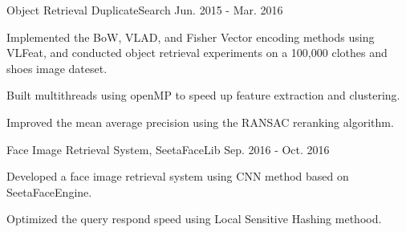 \begin{cventries}
  \cventry
    {Object Retrieval} %
    {DuplicateSearch} %
    {} %
    {Jun. 2015 - Mar. 2016} %
    {
      \begin{cvitems} %
        \item {Implemented the BoW, VLAD, and Fisher Vector encoding methods using VLFeat, and conducted object retrieval experiments on a 100,000 clothes and shoes image dateset.}
        \item {Built multithreads using openMP to speed up feature extraction and clustering.}
        \item {Improved the mean average precision using the RANSAC reranking algorithm.}
      \end{cvitems}
    }

  \cventry
    {Face Image Retrieval System, \href{https://github.com/willard-yuan/SeetaFaceLib}{\color{blue}{Code}}} %
    {SeetaFaceLib} %
    {} %
    {Sep. 2016 - Oct. 2016} %
    {
      \begin{cvitems} %
        \item {Developed a face image retrieval system using CNN method based on SeetaFaceEngine.}
        \item {Optimized the query respond speed using Local Sensitive Hashing methood.}
      \end{cvitems}
    }

\end{cventries}
